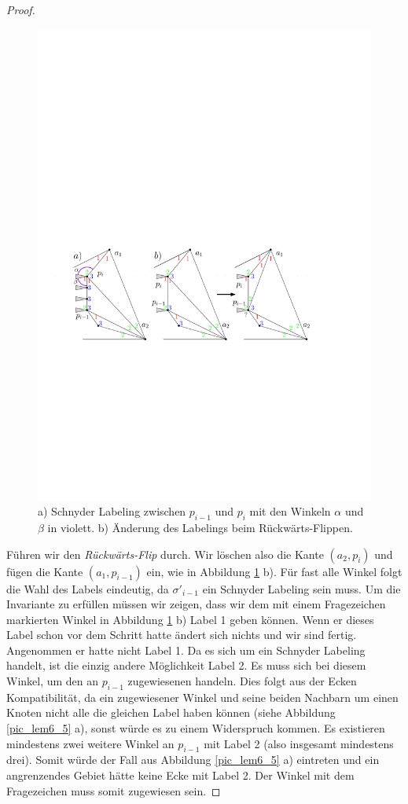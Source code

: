 \begin{proof}
\begin{figure}
	\centering
	  \includegraphics[width=1\textwidth]{lem6_4.pdf}
    	\caption{a) Schnyder Labeling zwischen $p_{i-1}$ und $p_{i}$ mit den Winkeln $\alpha$ und $\beta$ in violett. b) Änderung des Labelings beim Rückwärts-Flippen.}
    	\label{pic_lem6_4}
\end{figure}

Führen wir den \textit{Rückwärts-Flip} durch. Wir löschen also die Kante $(a_2,p_i)$ und fügen die Kante $(a_1,p_{i-1})$ ein, wie in Abbildung \ref{pic_lem6_4} b). Für fast alle Winkel folgt die Wahl des Labels eindeutig, da $\sigma'_{i-1}$ ein Schnyder Labeling sein muss. Um die Invariante zu erfüllen müssen wir zeigen, dass wir dem mit einem Fragezeichen markierten Winkel in Abbildung \ref{pic_lem6_4} b) Label 1 geben können. Wenn er dieses Label schon vor dem Schritt hatte ändert sich nichts und wir sind fertig. Angenommen er hatte nicht Label 1. Da es sich um ein Schnyder Labeling handelt, ist die einzig andere Möglichkeit Label 2. Es muss sich bei diesem Winkel, um den an $p_{i-1}$ zugewiesenen handeln. Dies folgt aus der Ecken Kompatibilität, da ein zugewiesener Winkel und seine beiden Nachbarn um einen Knoten nicht alle die gleichen Label haben können (siehe Abbildung \ref{pic_lem6_5} a), sonst würde es zu einem Widerspruch kommen. Es existieren mindestens zwei weitere Winkel an $p_{i-1}$ mit Label 2 (also insgesamt mindestens drei). Somit würde der Fall aus Abbildung \ref{pic_lem6_5} a) eintreten und ein angrenzendes Gebiet hätte keine Ecke mit Label 2. Der Winkel mit dem Fragezeichen muss somit zugewiesen sein.


\end{proof}
